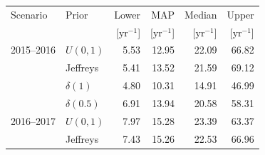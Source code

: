\documentclass[twocolumn,nofootinbib]{revtex4-1}
\newcommand{\yr}{\mathrm{yr}}
\begin{document}
\begin{table}
\centering
\begin{tabular}{llrrrr}
  \toprule
  Scenario & Prior & Lower & MAP & Median & Upper \\
  && [$\yr^{-1}$] & [$\yr^{-1}$]    & [$\yr^{-1}$]    & [$\yr^{-1}$]  \\
  \colrule
2015--2016  & $U(0,1)$ 	 & 5.53	 & 12.95	& 22.09	& 66.82	 \\
& Jeffreys 	 & 5.41	 & 13.52	& 21.59	& 69.12	 \\
& $\delta(1)$ 	 & 4.80	 & 10.31	& 14.91	& 46.99	 \\
& $\delta(0.5)$ 	 & 6.91	 & 13.94	& 20.58	& 58.31	\\
  \colrule
2016--2017  & $U(0,1)$ 	 & 7.97	 & 15.28	& 23.39	& 63.37	 \\
& Jeffreys 	 & 7.43	 & 15.26	& 22.53	& 66.96	 \\

\end{tabular}
\end{table}
\end{document}
